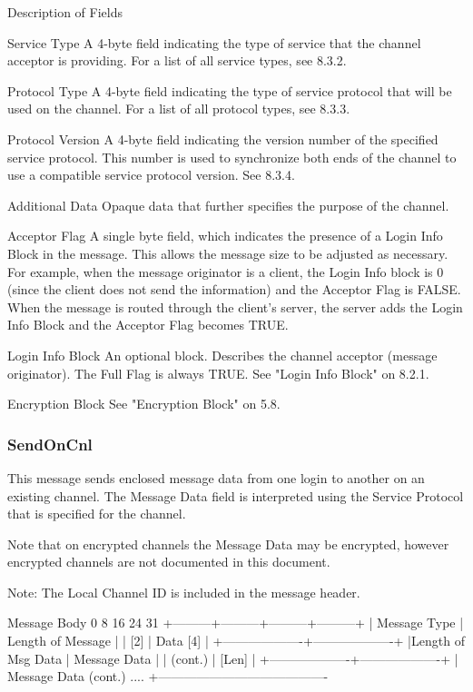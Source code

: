 \documentclass[titlepage,oneside]{book}
\begin{document}
Description of Fields

Service Type
  A 4-byte field indicating the type of service that the channel
  acceptor is providing. For a list of all service types, see
  8.3.2.

Protocol Type
  A 4-byte field indicating the type of service protocol that will be
  used on the channel. For a list of all protocol types, see
  8.3.3.

Protocol Version
  A 4-byte field indicating the version number of the specified service
  protocol. This number is used to synchronize both ends of the channel
  to use a compatible service protocol version. See 
  8.3.4.

Additional Data
  Opaque data that further specifies the purpose of the channel.

Acceptor Flag
  A single byte field, which indicates the presence of a Login Info
  Block in the message. This allows the message size to be adjusted as
  necessary. For example, when the message originator is a client, the
  Login Info block is 0 (since the client does not send the
  information) and the Acceptor Flag is FALSE. When the message is
  routed through the client's server, the server adds the Login Info
  Block and the Acceptor Flag becomes TRUE.

Login Info Block
  An optional block. Describes the channel acceptor (message
  originator). The Full Flag is always TRUE. See "Login Info Block" on
  8.2.1.

Encryption Block
  See "Encryption Block" on 5.8.

\subsubsection{SendOnCnl}

This message sends enclosed message data from one login to another on
an existing channel. The Message Data field is interpreted using the
Service Protocol that is specified for the channel.

Note that on encrypted channels the Message Data may be encrypted,
however encrypted channels are not documented in this document.

Note: The Local Channel ID is included in the message header.


Message Body
0         8         16        24      31
+---------+---------+---------+---------+
|    Message Type   | Length of Message |
|        [2]        |  Data [4]         |
+-------------------+-------------------+
|Length of Msg Data |  Message Data     |
|       (cont.)     |     [Len]         |
+-------------------+-------------------+
|      Message Data (cont.) ....
+----------------------------------------
\end{document}
